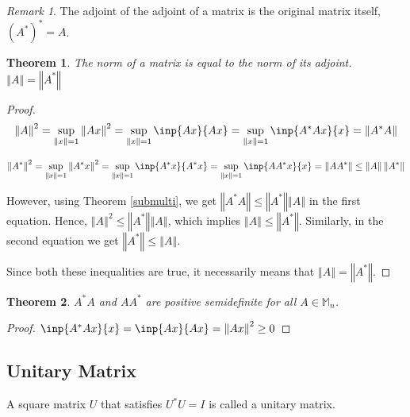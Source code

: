 \documentclass[twoside]{article}
\newcommand*\adj[1]{#1^*}
\newcommand*\norm[1]{\left \Vert #1 \right\Vert}
\theoremstyle{plain}
\newtheorem{theorem}{Theorem}
\theoremstyle{definition}
\theoremstyle{remark}
\newtheorem*{remark}{Remark}
\begin{document}
\begin{remark} The adjoint of the adjoint of a matrix is the original matrix itself, \(\adj{(\adj{A})} = A\). \end{remark}




\begin{theorem} The norm of a matrix is equal to the norm of its adjoint. \(\norm{A} = \norm{\adj{A}}\) \end{theorem}
\begin{proof}
\[ \norm{A}^2   = \sup_{\norm{x} = 1} \norm{Ax}^2  = \sup_{\norm{x} = 1} \inp{Ax}{Ax}  = \sup_{\norm{x} = 1} \inp{\adj{A} A x}{x}  = \norm{\adj{A} A} \]

\[ \norm{\adj{A}}^2   = \sup_{\norm{x} = 1} \norm{\adj{A} x}^2  = \sup_{\norm{x} = 1} \inp{\adj{A}x}{\adj{A}x}  = \sup_{\norm{x} = 1} \inp{A \adj{A} x}{x}  = \norm{A \adj{A}} \le \norm{A} \norm{\adj{A}}\]

However, using  Theorem \ref{submulti}, we get  \(\norm{\adj{A} A} \le \norm{\adj{A}} \norm{A}\) in the first equation. Hence, \(\norm{A}^2 \le \norm{\adj{A}} \norm{A}\), which implies  \(\norm{A} \le \norm{\adj{A}}\). Similarly, in the second equation we get \(\norm{\adj{A}} \le \norm{A}\). 

Since both these inequalities are true, it necessarily means that \(\norm{A} = \norm{\adj{A}}\).
\end{proof}

\begin{theorem}\label{pdm} \(\adj{A} A\) and \(A \adj{A}\) are positive semidefinite for all \(A \in \mathbb{M}_n\). \end{theorem}
\begin{proof} \(\inp{\adj{A} A x}{ x} = \inp{Ax}{Ax} = \norm{Ax}^2 \ge 0\)\end{proof}

\subsection{Unitary Matrix}

A square matrix \(U\) that satisfies \(\adj{U} U = I\) is called a unitary matrix.
\end{document}
